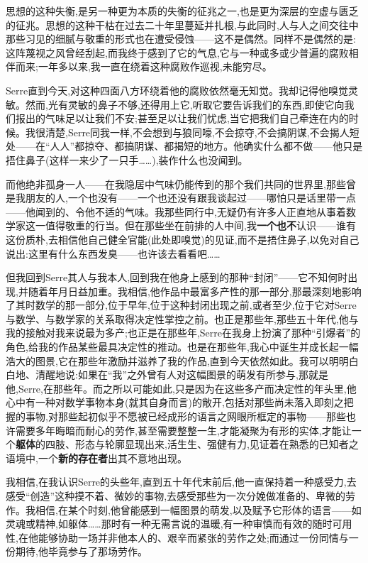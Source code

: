 思想的这种失衡,是另一种更为本质的失衡的征兆之一,也是更为深层的空虚与匮乏的征兆。思想的这种干枯在过去二十年里蔓延并扎根,与此同时,人与人之间交往中那些习见的细腻与敬重的形式也在遭受侵蚀——这不是偶然。同样不是偶然的是:这阵蔑视之风曾经刮起,而我终于感到了它的气息,它与一种或多或少普遍的腐败相伴而来;一年多以来,我一直在绕着这种腐败作巡视,未能穷尽。

Serre直到今天,对这种四面八方环绕着他的腐败依然毫无知觉。我却记得他嗅觉灵敏。然而,光有灵敏的鼻子不够,还得用上它,听取它要告诉我们的东西,即使它向我们报出的气味足以让我们不安;甚至足以让我们忧虑,当它把我们自己牵连在内的时候。我很清楚,Serre同我一样,不会想到与狼同嚎,不会掠夺,不会搞阴谋,不会揭人短处——在“人人”都掠夺、都搞阴谋、都揭短的地方。他确实什么都不做——他只是捂住鼻子(这样一来少了一只手……),装作什么也没闻到。

而他绝非孤身一人——在我隐居中气味仍能传到的那个我们共同的世界里,那些曾是我朋友的人,一个也没有——一个也还没有跟我谈起过——哪怕只是话里带一点——他\dmark{}闻到的、令他不适的气味。我那些同行中,无疑仍有许多人正直地从事着数学家这一值得敬重的行当。但在那些坐在前排的人中间,我\textbf{一个也不}认识——谁有这份质朴,去相信他自己健全官能(此处即嗅觉)的见证,而不是捂住鼻子,以免对自己说出:这里有什么东西发臭——也许该去看看吧……

但我回到Serre其人与我本人,回到我在他身上感到的那种“封闭”——它不知何时出现,并随着年月日益加重。我相信,他作品中最富多产性的那一部分,那最深刻地影响了其时数学的那一部分,位于早年,位于这种封闭出现之前,或者至少,位于它对Serre与数学、与数学家的关系取得决定性掌控之前。也正是那些年,那些五十年代,他与我的接触对我来说最为多产;也正是在那些年,Serre在我身上扮演了那种“引爆者”的角色,给我的作品某些最具决定性的推动。也是在那些年,我心中诞生并成长起一幅浩大的图景,它在那些年激励并滋养了我的作品,直到今天依然如此。我可以明明白白地、清醒地说:如果在“我”之外曾有人对这幅图景的萌发有所参与,那就是他,Serre,在那些年。而之所以可能如此,只是因为在这些多产而决定性的年头里,他心中有一种对数学事物本身(就其自身而言)的敞开,包括对那些尚未落入即刻之把握的事物,对那些起初似乎不愿被已经成形的语言之网眼所框定的事物——那些也许需要多年晦暗而耐心的劳作,甚至需要整整一生,才能凝聚为有形的实体,才能让一个\textbf{躯体}的四肢、形态与轮廓显现出来,活生生、强健有力,见证着在熟悉的已知者之语境中,一个\textbf{新的存在者}出其不意地出现。

我相信,在我认识Serre的头些年,直到五十年代末前后,他一直保持着一种感受力,去感受“创造”这种摸不着、微妙的事物,去感受那些为一次分娩做准备的、卑微的劳作。我相信,在某个时刻,他曾能感到一幅图景的萌发,以及赋予它形体的语言——如灵魂或精神,如躯体……那时有一种无需言说的温暖,有一种审慎而有效的随时可用性,在他能够协助一场并非他本人的、艰辛而紧张的劳作之处;而通过一份同情与一份期待,他毕竟参与了那场劳作。

